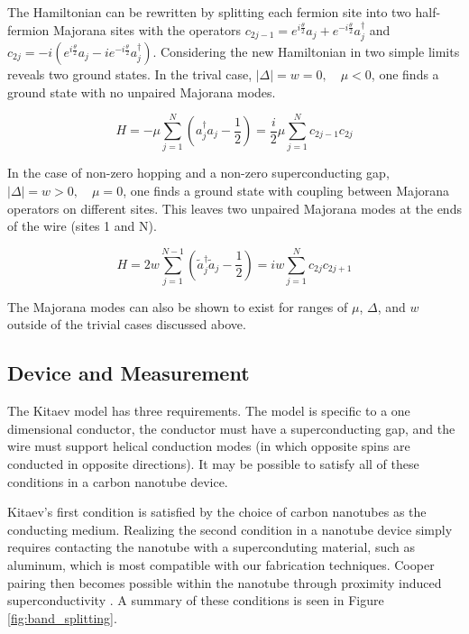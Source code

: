 The Hamiltonian can be rewritten by splitting each fermion site into two half-fermion Majorana sites with the operators $c_{2j-1}=e^{i\frac{\theta}{2}}a_j+e^{-i\frac{\theta}{2}}a_j^\dagger$ and $c_{2j}=-i\left(e^{i\frac{\theta}{2}}a_j-ie^{-i\frac{\theta}{2}}a_j^\dagger\right)$.  Considering the new Hamiltonian in two simple limits reveals two ground states. In the trival case, $\left|\Delta\right| = w = 0,\quad \mu < 0$, one finds a ground state with no unpaired Majorana modes.

\begin{equation}
	H = -\mu\sum_{j=1}^{N}\left(a_j^\dagger a_j - \frac{1}{2}\right) = \frac{i}{2}\mu \sum_{j=1}^{N} c_{2j-1}c_{2j}
\end{equation}

In the case of non-zero hopping and a non-zero superconducting gap, $\left|\Delta\right| = w > 0,\quad \mu = 0$, one finds a ground state with coupling between Majorana operators on different sites.  This leaves two unpaired Majorana modes at the ends of the wire (sites 1 and N).  

\begin{equation}
	H = 2w\sum_{j=1}^{N-1}\left(\tilde{a}_j^\dagger \tilde{a}_j - \frac{1}{2}\right) = iw\sum_{j=1}^{N} c_{2j}c_{2j+1}
\end{equation}

The Majorana modes can also be shown to exist for ranges of $\mu$, $\Delta$, and $w$ outside of the trivial cases discussed above.  

\subsection{Device and Measurement}

The Kitaev model has three requirements.  The model is specific to a one dimensional conductor, the conductor must have a superconducting gap, and the wire must support helical conduction modes (in which opposite spins are conducted in opposite directions).  It may be possible to satisfy all of these conditions in a carbon nanotube device.

Kitaev's first condition is satisfied by the choice of carbon nanotubes as the conducting medium.  Realizing the second condition in a nanotube device simply requires contacting the nanotube with a superconduting material, such as aluminum, which is most compatible with our fabrication techniques.  Cooper pairing then becomes possible within the nanotube through proximity induced superconductivity \cite{Kasumov1999, JarilloHerrero2006}. A summary of these conditions is seen in Figure \ref{fig:band_splitting}. 

